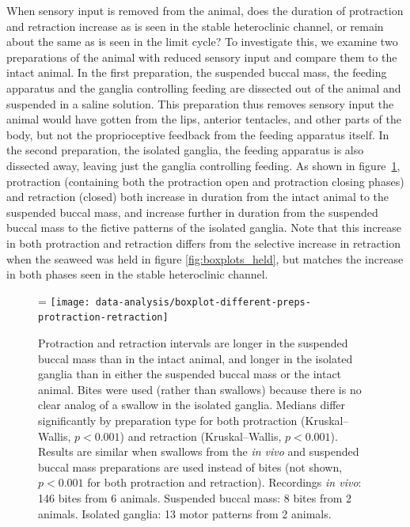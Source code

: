 When sensory input is removed from the animal, does the duration of protraction
and retraction increase as is seen in the stable heteroclinic channel, or remain about the same as is
seen in the limit cycle?  To investigate this, we examine two preparations of the
animal with reduced sensory input and compare them to the intact animal.  In
the first preparation, the suspended buccal mass\citep{mcmanus_vitro_2012},
the feeding apparatus and the ganglia controlling feeding are dissected
out of the animal and suspended in a saline solution.  This preparation thus removes sensory
input the animal would have gotten from the lips, anterior tentacles, and other
parts of the body, but not the proprioceptive feedback from the feeding
apparatus itself.  In the second preparation, the isolated ganglia, the feeding
apparatus is also dissected away, leaving just the ganglia controlling feeding.
As shown in figure~\ref{fig:boxplots_different_preps}, protraction (containing
both the protraction open and protraction closing phases) and
retraction (closed) both increase in duration from the intact animal to the suspended
buccal mass, and increase further in duration from the suspended buccal mass to
the fictive patterns of the isolated ganglia.  Note that this increase in both protraction and
retraction differs from the selective increase in retraction when the seaweed
was held in figure \ref{fig:boxplots_held}, but matches the increase in both
phases seen in the stable heteroclinic channel.

\begin{figure}
    \ifthesis
        \linewidth
    \else
        \figwidth=\linewidth
    \fi
    \centering
    \texttt{[image: data-analysis/boxplot-different-preps-protraction-retraction]}
    \caption[Behavior of reduced preparations]{
    Protraction and retraction intervals are longer in the suspended
    buccal mass than in the intact animal, and longer in the isolated ganglia
    than in either the suspended buccal mass or the intact animal.  Bites were
    used (rather than swallows) because there is no clear analog of a swallow
    in the isolated ganglia. Medians differ significantly by preparation type
    for both protraction (Kruskal--Wallis, $p < 0.001$) and retraction
    (Kruskal--Wallis, $p < 0.001$).  Results are similar when swallows from the
    \textit{in vivo} and suspended buccal mass preparations are used instead
    of bites (not shown, $p < 0.001$ for both protraction and retraction).
    Recordings \textit{in vivo}: 146 bites from 6 animals.  Suspended buccal
    mass: 8 bites from 2 animals.  Isolated ganglia: 13 motor patterns from 2
    animals.  }
    \label{fig:boxplots_different_preps}
\end{figure}

